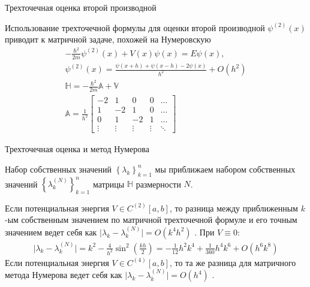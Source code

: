 \documentclass[10pt,pdf,hyperref={unicode},xcolor=dvipsnames]{beamer}
\newcommand{\lb}{\left(}
\newcommand{\rb}{\right)}
\newcommand{\bbA}{\mathbb{A}}
\newcommand{\bbV}{\mathbb{V}}
\newcommand{\bbH}{\mathbb{H}}
\newcommand{\lc}{\left\{}
\newcommand{\rc}{\right\}}
\newcommand{\psip}[1]{\psi^{(#1)}(x)}
\begin{document}
\begin{frame}{Трехточечная оценка второй производной}
    \begin{block}{}
        Использование трехточечной формулы для оценки второй производной $\psip{2}$ приводит к матричной задаче, похожей на Нумеровскую 
        \begin{gather}
            -\frac{ \hbar^2 }{ 2m } \psip{2} + V(x) \psi(x) = E \psi(x), \\
            \psip{2} = \frac{\psi(x+h) + \psi(x-h) - 2\psi(x)}{h^2} + O(h^2) \\
            \bbH = - \frac{\hbar^2}{2m} \bbA + \bbV \\
            \bbA = \frac{1}{h^2} 
            \begin{bmatrix}
                -2 & 1 & 0 & 0 & \dots \\
                1 & -2 & 1 & 0 & \dots \\
                0 & 1 & -2 & 1 & \dots \\
                \vdots & \vdots & \vdots & \vdots & \ddots
            \end{bmatrix}
        \end{gather}
    \end{block}
\end{frame}

\begin{frame}{Трехточечная оценка и метод Нумерова}
    \begin{block}{}
        Набор собственных значений $\lc \lambda_k \rc_{k=1}^n$ мы приближаем набором собственных значений $\lc \lambda_k^{(N)} \rc_{k=1}^{n}$ матрицы $\bbH$ размерности $N$. \par 
        Если потенциальная энергия $V \in C^{(2)}[a, b]$, то разница между приближенным $k$-ым собственным значением  по матричной трехточечной формуле и его точным значением ведет себя как $\vert \lambda_k - \lambda_k^{(N)} \vert = O( k^4 h^2 )$ . При $V \equiv 0$:
        \begin{gather}
            \vert \lambda_k - \lambda_k^{(N)} \vert = k^2 - \frac{4}{h^2} \sin^2 \lb \frac{k h}{2} \rb = -\frac{1}{12} h^2 k^4 + \frac{1}{360} h^4 k^6 + O(h^6 k^8)
        \end{gather}
        Если потенциальная энергия $V \in C^{(4)}[a, b]$, то та же разница для матричного метода Нумерова ведет себя как $\vert \lambda_k - \lambda_k^{(N)} \vert = O(h^4)$ .
    \end{block}
\end{frame}
\end{document}
